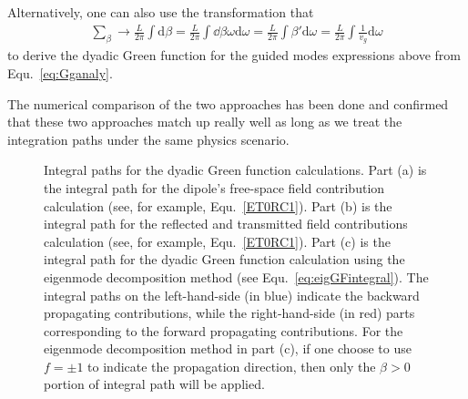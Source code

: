 \documentclass[]{report}
\begin{document}
Alternatively, one can also use the transformation that 
\begin{align}
\sum_{\beta} \rightarrow \frac{L}{2\pi} \int \mathrm{d}\beta=\frac{L}{2\pi} \int \dd{\beta}{\omega} \mathrm{d} \omega =\frac{L}{2\pi} \int \beta' \mathrm{d} \omega=\frac{L}{2\pi} \int \frac{1}{v_g} \mathrm{d} \omega
\end{align}
to derive the dyadic Green function for the guided modes expressions above from Equ.~\eqref{eq:Gganaly}. 


The numerical comparison of the two approaches has been done and confirmed that these two approaches match up really well as long as we treat the integration paths under the same physics scenario.  

\begin{figure}
\centering{}
\caption{Integral paths for the dyadic Green function calculations. Part (a) is the integral path for the dipole's free-space field contribution calculation (see, for example, Equ.~\eqref{ET0RC1}). Part (b) is the integral path for the reflected and transmitted field contributions calculation (see, for example, Equ.~\eqref{ET0RC1}). Part (c) is the integral path for the dyadic Green function calculation using the eigenmode decomposition method (see Equ.~\eqref{eq:eigGFintegral}). The integral paths on the left-hand-side (in blue) indicate the backward propagating contributions, while the right-hand-side (in red) parts corresponding to the forward propagating contributions. For the eigenmode decomposition method in part (c), if one choose to use $ f=\pm 1 $ to indicate the propagation direction, then only the $ \beta>0 $ portion of integral path will be applied. }
\label{fig:integralpaths}
\end{figure}
\end{document}
